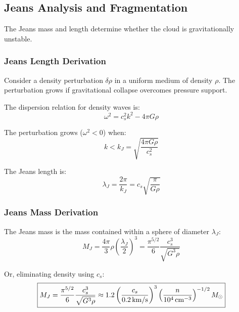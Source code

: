 \documentclass[twocolumn,amsmath,amssymb,prd,superscriptaddress,nofootinbib]{revtex4-2}
\begin{document}
\subsection{Jeans Analysis and Fragmentation}
\label{sec:jeans}

The Jeans mass and length determine whether the cloud is gravitationally unstable.

\subsubsection{Jeans Length Derivation}

Consider a density perturbation $\delta\rho$ in a uniform medium of density $\rho$. The perturbation grows if gravitational collapse overcomes pressure support.

The dispersion relation for density waves is:
\begin{equation}
    \omega^2 = c_s^2 k^2 - 4\pi G \rho
\end{equation}

The perturbation grows ($\omega^2 < 0$) when:
\begin{equation}
    k < k_J = \sqrt{\frac{4\pi G \rho}{c_s^2}}
\end{equation}

The Jeans length is:
\begin{equation}
    \boxed{\lambda_J = \frac{2\pi}{k_J} = c_s\sqrt{\frac{\pi}{G\rho}}}
    \label{eq:lambda_J}
\end{equation}

\subsubsection{Jeans Mass Derivation}

The Jeans mass is the mass contained within a sphere of diameter $\lambda_J$:
\begin{equation}
    M_J = \frac{4\pi}{3} \rho \left(\frac{\lambda_J}{2}\right)^3 = \frac{\pi^{5/2}}{6} \frac{c_s^3}{\sqrt{G^3 \rho}}
    \label{eq:M_J}
\end{equation}

Or, eliminating density using $c_s$:
\begin{equation}
    \boxed{M_J = \frac{\pi^{5/2}}{6} \frac{c_s^3}{\sqrt{G^3 \rho}} \approx 1.2 \left(\frac{c_s}{0.2\,{\rm km/s}}\right)^3 \left(\frac{n}{10^4\,{\rm cm}^{-3}}\right)^{-1/2} M_\odot}
\end{equation}
\end{document}
